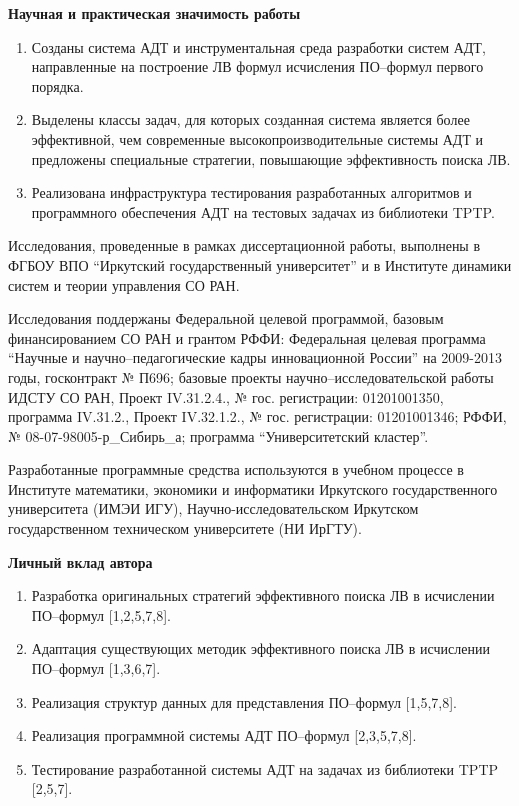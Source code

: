 \documentclass[a4paper]{report}
\begin{document}
\textbf{Научная и практическая значимость работы}
\begin{enumerate}
\item Созданы система АДТ и инструментальная среда разработки систем АДТ, направленные на построение ЛВ формул исчисления ПО--формул первого порядка.
\item Выделены классы задач, для которых созданная система является более эффективной, чем современные высокопроизводительные системы АДТ и предложены специальные стратегии, повышающие эффективность поиска ЛВ.
\item Реализована инфраструктура тестирования разработанных алгоритмов и программного обеспечения АДТ на тестовых задачах из библиотеки TPTP.
\end{enumerate}


Исследования, проведенные в рамках  диссертационной работы, выполнены в ФГБОУ ВПО ``Иркутский государственный университет'' и в Институте динамики систем и теории управления СО РАН.

Исследования поддержаны Федеральной целевой программой, базовым финансированием СО РАН и грантом РФФИ:
Федеральная целевая программа ``Научные и научно--педагогические кадры инновационной России'' на 2009-2013 годы, госконтракт № П696;
базовые проекты научно--исследовательской работы ИДСТУ СО РАН, Проект IV.31.2.4., № гос. регистрации: 01201001350, программа IV.31.2., Проект IV.32.1.2., № гос. регистрации: 01201001346;
РФФИ, № 08-07-98005-р\_Сибирь\_а;
программа ``Университетский кластер''.

Разработанные программные средства используются в учебном процессе в Институте математики, экономики и информатики Иркутского государственного университета (ИМЭИ ИГУ), Научно-исследовательском Иркутском государственном техническом университете (НИ ИрГТУ). %



\textbf{Личный вклад автора}
\begin{enumerate}
\item Разработка оригинальных стратегий эффективного поиска ЛВ в исчислении ПО--формул [1,2,5,7,8].
\item Адаптация существующих методик эффективного поиска ЛВ в исчислении ПО--формул [1,3,6,7].
\item Реализация структур данных для представления ПО--формул [1,5,7,8].
\item Реализация программной системы АДТ ПО--формул [2,3,5,7,8].
\item Тестирование разработанной системы АДТ на задачах из библиотеки TPTP [2,5,7].
\end{enumerate}
\end{document}
